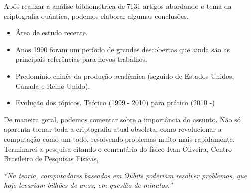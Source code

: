 Após realizar a análise bibliométrica de 7131 artigos abordando o tema da criptografia quântica, podemos elaborar algumas conclusões.

\begin{itemize}
    \item Área de estudo recente.
    \item Anos 1990 foram um período de grandes descobertas que ainda são as principais referências para novos trabalhos.
    \item Predomínio chinês da produção acadêmica (seguido de Estados Unidos, Canada e Reino Unido).
    \item Evolução dos tópicos. Teórico (1999 - 2010) para prático (2010 -)
\end{itemize}

De maneira geral, podemos comentar sobre a importância do assunto. Não só aparenta tornar toda a criptografia atual obsoleta, como revolucionar a computação como um todo, resolvendo problemas muito mais rapidamente. Terminarei a pesquisa citando o comentário do físico Ivan Oliveira, Centro Brasileiro de Pesquisas Físicas, 

\textit{“Na teoria, computadores baseados em Qubits poderiam resolver problemas, que hoje levariam bilhões de anos, em questão de minutos.”}